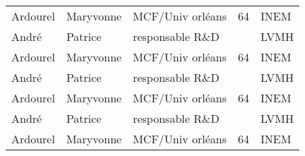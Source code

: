 \begin{tabular}{|m{2cm}|m{2cm}|m{2cm}|m{1cm}|m{8cm}|}
 \cellcolor{couleurClaire} \color{couleurTexte} Ardourel  & \cellcolor{couleurClaire} \color{couleurTexte} Maryvonne & \cellcolor{couleurClaire} \color{couleurTexte} MCF/Univ orléans & \cellcolor{couleurClaire} \color{couleurTexte} 64 & \cellcolor{couleurClaire} \color{couleurTexte} INEM \\ \cline{1-5}
 \color{black} André & \color{black} Patrice & \color{black} responsable R\&D & \color{black} & \color{black} LVMH \\ \cline{1-5}

 \cellcolor{couleurClaire} \color{couleurTexte} Ardourel  & \cellcolor{couleurClaire} \color{couleurTexte} Maryvonne & \cellcolor{couleurClaire} \color{couleurTexte} MCF/Univ orléans & \cellcolor{couleurClaire} \color{couleurTexte} 64 & \cellcolor{couleurClaire} \color{couleurTexte} INEM \\ \cline{1-5}
 \color{black} André & \color{black} Patrice & \color{black} responsable R\&D & \color{black} & \color{black} LVMH \\ \cline{1-5}

 \cellcolor{couleurClaire} \color{couleurTexte} Ardourel  & \cellcolor{couleurClaire} \color{couleurTexte} Maryvonne & \cellcolor{couleurClaire} \color{couleurTexte} MCF/Univ orléans & \cellcolor{couleurClaire} \color{couleurTexte} 64 & \cellcolor{couleurClaire} \color{couleurTexte} INEM \\ \cline{1-5}
 \color{black} André & \color{black} Patrice & \color{black} responsable R\&D & \color{black} & \color{black} LVMH \\ \cline{1-5}

 \cellcolor{couleurClaire} \color{couleurTexte} Ardourel  & \cellcolor{couleurClaire} \color{couleurTexte} Maryvonne & \cellcolor{couleurClaire} \color{couleurTexte} MCF/Univ orléans & \cellcolor{couleurClaire} \color{couleurTexte} 64 & \cellcolor{couleurClaire} \color{couleurTexte} INEM \\ \cline{1-5}

\end{tabular}

